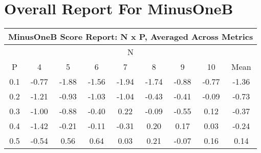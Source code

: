 \documentclass[11pt,a4paper]{report}
\begin{document}
\chapter{Overall Report For MinusOneB}
\begin{longtable}{ | c || c | c | c | c | c | c | c || c |}
\hline
\multicolumn{9}{|c|}{ MinusOneB Score Report: N x P, Averaged Across Metrics } \\
\hline
\multicolumn{9}{|c|}{ N } \\
\hline
P & 4 & 5 & 6 & 7 & 8 & 9 & 10 & Mean\\
\hline
\hline
\endhead
0.1 &  \cellcolor[HTML]{FFEFEF} -0.77 &  \cellcolor[HTML]{FFCFCF} -1.88 &  \cellcolor[HTML]{FFD7D7} -1.56 &  \cellcolor[HTML]{FFCFCF} -1.94 &  \cellcolor[HTML]{FFD7D7} -1.74 &  \cellcolor[HTML]{FFE7E7} -0.88 &  \cellcolor[HTML]{FFEFEF} -0.77 &  \cellcolor[HTML]{FFDFDF} -1.36 \\
0.2 &  \cellcolor[HTML]{FFDFDF} -1.21 &  \cellcolor[HTML]{FFE7E7} -0.93 &  \cellcolor[HTML]{FFE7E7} -1.03 &  \cellcolor[HTML]{FFE7E7} -1.04 &  \cellcolor[HTML]{FFF7F7} -0.43 &  \cellcolor[HTML]{FFF7F7} -0.41 &  \cellcolor[HTML]{FFFFFF} -0.09 &  \cellcolor[HTML]{FFEFEF} -0.73 \\
0.3 &  \cellcolor[HTML]{FFE7E7} -1.00 &  \cellcolor[HTML]{FFE7E7} -0.88 &  \cellcolor[HTML]{FFF7F7} -0.40 &  \cellcolor[HTML]{F7F7FF} 0.22 &  \cellcolor[HTML]{FFFFFF} -0.09 &  \cellcolor[HTML]{FFEFEF} -0.55 &  \cellcolor[HTML]{FFFFFF} 0.12 &  \cellcolor[HTML]{FFF7F7} -0.37 \\
0.4 &  \cellcolor[HTML]{FFDFDF} -1.42 &  \cellcolor[HTML]{FFF7F7} -0.21 &  \cellcolor[HTML]{FFFFFF} -0.11 &  \cellcolor[HTML]{FFF7F7} -0.31 &  \cellcolor[HTML]{F7F7FF} 0.20 &  \cellcolor[HTML]{F7F7FF} 0.17 &  \cellcolor[HTML]{FFFFFF} 0.03 &  \cellcolor[HTML]{FFF7F7} -0.24 \\
0.5 &  \cellcolor[HTML]{FFEFEF} -0.54 &  \cellcolor[HTML]{EFEFFF} 0.56 &  \cellcolor[HTML]{EFEFFF} 0.64 &  \cellcolor[HTML]{FFFFFF} 0.03 &  \cellcolor[HTML]{F7F7FF} 0.21 &  \cellcolor[HTML]{FFFFFF} -0.07 &  \cellcolor[HTML]{F7F7FF} 0.16 &  \cellcolor[HTML]{FFFFFF} 0.14 \\

\end{longtable}
\end{document}
